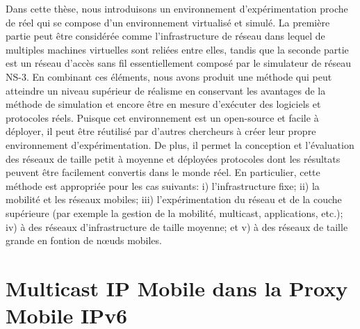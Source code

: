 Dans cette thèse, nous introduisons un environnement d'expérimentation proche de réel qui se compose d'un environnement virtualisé et simulé. La première partie peut être considérée comme l'infrastructure de réseau dans lequel de multiples machines virtuelles sont reliées entre elles, tandis que la seconde partie est un réseau d'accès sans fil essentiellement composé par le simulateur de réseau NS-3. En combinant ces éléments, nous avons produit une méthode qui peut atteindre un niveau supérieur de réalisme en conservant les avantages de la méthode de simulation et encore être en mesure d'exécuter des logiciels et protocoles réels. Puisque cet environnement est un open-source et facile à déployer, il peut être réutilisé par d'autres chercheurs à créer leur propre environnement d'expérimentation. De plus, il permet la conception et l'évaluation des réseaux de taille petit à moyenne et déployées protocoles dont les résultats peuvent être facilement convertis dans le monde réel. En particulier, cette méthode est appropriée pour les cas suivants: i) l'infrastructure fixe; ii) la mobilité et les réseaux mobiles; iii) l'expérimentation du réseau et de la couche supérieure (par exemple la gestion de la mobilité, multicast, applications, etc.); iv) à des réseaux d'infrastructure de taille moyenne; et v) à des réseaux de taille grande en fontion de nœuds mobiles.


\section{Multicast IP Mobile dans la Proxy Mobile IPv6}
